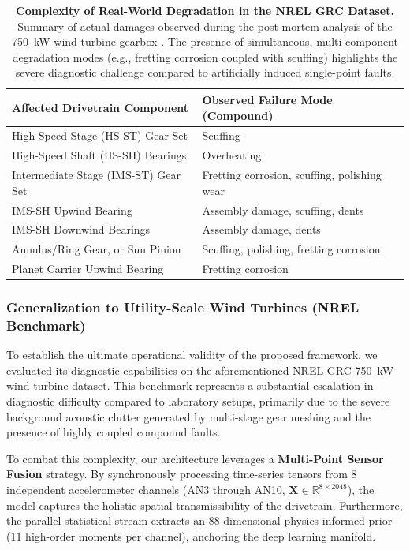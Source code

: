 \documentclass[5p,times,twocolumn]{elsarticle}
\begin{document}
\begin{table}[htbp]
\centering
\caption{\textbf{Complexity of Real-World Degradation in the NREL GRC Dataset.} Summary of actual damages observed during the post-mortem analysis of the \SI{750}{kW} wind turbine gearbox \cite{nrel_reference}. The presence of simultaneous, multi-component degradation modes (e.g., fretting corrosion coupled with scuffing) highlights the severe diagnostic challenge compared to artificially induced single-point faults.}
\label{tab:nrel_faults}
\renewcommand{\arraystretch}{1.2}
\setlength{\tabcolsep}{12pt}
\begin{tabular}{@{} l p{5.5cm} @{}}
\toprule
\textbf{Affected Drivetrain Component} & \textbf{Observed Failure Mode (Compound)} \\ \midrule
High-Speed Stage (HS-ST) Gear Set & Scuffing \\
High-Speed Shaft (HS-SH) Bearings & Overheating \\
Intermediate Stage (IMS-ST) Gear Set & Fretting corrosion, scuffing, polishing wear \\
IMS-SH Upwind Bearing & Assembly damage, scuffing, dents \\
IMS-SH Downwind Bearings & Assembly damage, dents \\
Annulus/Ring Gear, or Sun Pinion & Scuffing, polishing, fretting corrosion \\
Planet Carrier Upwind Bearing & Fretting corrosion \\ \bottomrule
\end{tabular}
\end{table}

\subsubsection{Generalization to Utility-Scale Wind Turbines (NREL Benchmark)}
To establish the ultimate operational validity of the proposed framework, we evaluated its diagnostic capabilities on the aforementioned NREL GRC \SI{750}{kW} wind turbine dataset. This benchmark represents a substantial escalation in diagnostic difficulty compared to laboratory setups, primarily due to the severe background acoustic clutter generated by multi-stage gear meshing and the presence of highly coupled compound faults.

To combat this complexity, our architecture leverages a \textbf{Multi-Point Sensor Fusion} strategy. By synchronously processing time-series tensors from 8 independent accelerometer channels (AN3 through AN10, $\mathbf{X} \in \mathbb{R}^{8 \times 2048}$), the model captures the holistic spatial transmissibility of the drivetrain. Furthermore, the parallel statistical stream extracts an 88-dimensional physics-informed prior (11 high-order moments per channel), anchoring the deep learning manifold.
\end{document}
